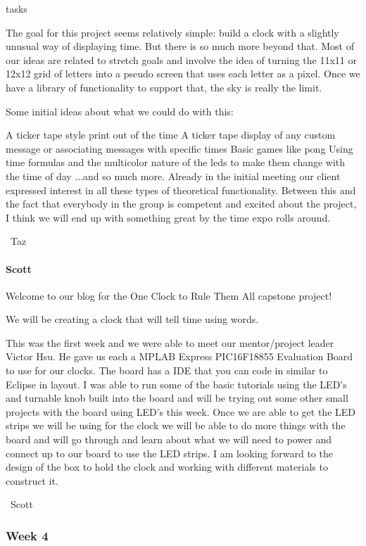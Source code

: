 tasks\documentclass[onecolumn, draftclsnofoot,10pt, compsoc]{IEEEtran}
\begin{document}
The goal for this project seems relatively simple: build a clock with a slightly unusual way of displaying time. But there is so much more beyond that. Most of our ideas are related to stretch goals and involve the idea of turning the 11x11 or 12x12 grid of letters into a pseudo screen that uses each letter as a pixel. Once we have a library of functionality to support that, the sky is really the limit.

Some initial ideas about what we could do with this:

A ticker tape style print out of the time
A ticker tape display of any custom message or associating messages with specific times
Basic games like pong
Using time formulas and the multicolor nature of the leds to make them change with the time of day
...and so much more. Already in the initial meeting our client expressed interest in all these types of theoretical functionality. Between this and the fact that everybody in the group is competent and excited about the project, I think we will end up with something great by the time expo rolls around.

~Taz
\paragraph{Scott}
Welcome to our blog for the One Clock to Rule Them All capstone project!

We will be creating a clock that will tell time using words.

This was the first week and we were able to meet our mentor/project leader Victor Hsu. He gave us each a MPLAB Express PIC16F18855 Evaluation Board to use for our clocks. The board has a IDE that you can code in similar to Eclipse in layout. I was able to run some of the basic tutorials using the LED's and turnable knob built into the board and will be trying out some other small projects with the board using LED's this week. Once we are able to get the LED strips we will be using for the clock we will be able to do more things with the board and will go through and learn about what we will need to power and connect up to our board to use the LED strips. I am looking forward to the design of the box to hold the clock and working with different materials to construct it.

~Scott
\subsubsection{Week 4}
\end{document}
